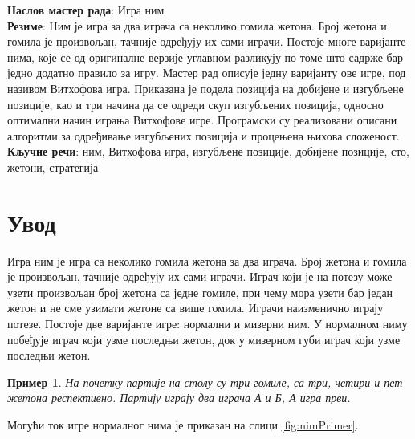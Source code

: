 \documentclass[a4paper]{article}
\newtheorem{example}{Пример}
\begin{document}

\newpage

\textbf{Наслов мастер рада}: Игра ним\\

\textbf{Резиме}: Ним је игра за два играча са неколико гомила жетона. Број жетона и гомила је произвољан, тачније одређују их сами играчи. Постоје многе варијанте нима, које се од оригиналне верзије углавном разликују по томе што садрже бар једно додатно правило за игру. Мастер рад описује једну варијанту ове игре, под називом Витхофова игра. Приказана је подела позиција на добијене и изгубљене позиције, као и три начина да се одреди скуп изгубљених позиција, односно оптимални начин играња Витхофове игре. Програмски су реализовани описани алгоритми за одређивање изгубљених позиција и процењена њихова сложеност.\\

\textbf{Кључне речи}: ним, Витхофова игра, изгубљене позиције, добијене позиције, сто, жетони, стратегија

\newpage

\tableofcontents

\newpage
{}

\section{Увод}
\label{sec:uvod}

Игра ним \cite{carls_buton} је игра са неколико гомила жетона за два играча. Број жетона и гомила је произвољан, тачније одређују их сами играчи. Играч који је на потезу може узети произвољан број жетона са једне гомиле, при чему мора узети бар један жетон и не сме узимати жетоне са више гомила. Играчи наизменично играју потезе. Постоје две варијанте игре: нормални и мизерни ним. У нормалном ниму побеђује играч који узме последњи жетон, док у мизерном губи играч који узме последњи жетон.

\begin{example}
На почетку партије на столу су три гомиле, са три, четири и пет жетона респективно. Партију играју два играча \textit{А} и \textit{Б}, \textit{А} игра први. 
\end{example}

Могући ток игре нормалног нима је приказан на слици \ref{fig:nimPrimer}.
\end{document}
